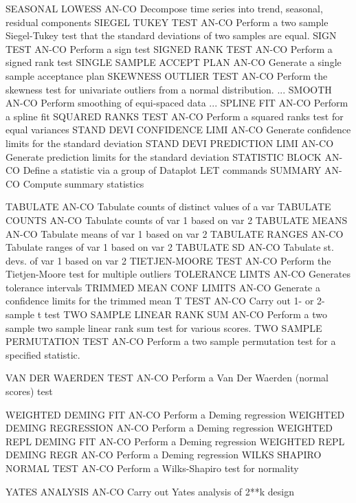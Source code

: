 SEASONAL LOWESS             AN-CO Decompose time series into trend, seasonal, residual components
SIEGEL TUKEY TEST           AN-CO Perform a two sample Siegel-Tukey test that the standard deviations of two samples are equal.
SIGN TEST                   AN-CO Perform a sign test
SIGNED RANK TEST            AN-CO Perform a signed rank test
SINGLE SAMPLE ACCEPT PLAN   AN-CO Generate a single sample acceptance plan
SKEWNESS OUTLIER TEST       AN-CO Perform the skewness test for univariate outliers from a normal distribution.
... SMOOTH                  AN-CO Perform smoothing of equi-spaced data
... SPLINE FIT              AN-CO Perform a spline fit
SQUARED RANKS TEST          AN-CO Perform a squared ranks test for equal variances
STAND DEVI CONFIDENCE LIMI  AN-CO Generate confidence limits for the standard deviation
STAND DEVI PREDICTION LIMI  AN-CO Generate prediction limits for the standard deviation
STATISTIC BLOCK             AN-CO Define a statistic via a group of Dataplot LET commands
SUMMARY                     AN-CO Compute summary statistics

TABULATE                    AN-CO Tabulate counts of distinct values of a var
TABULATE COUNTS             AN-CO Tabulate counts of var 1 based on var 2
TABULATE MEANS              AN-CO Tabulate means of var 1 based on var 2
TABULATE RANGES             AN-CO Tabulate ranges of var 1 based on var 2
TABULATE SD                 AN-CO Tabulate st. devs. of var 1 based on var 2
TIETJEN-MOORE TEST          AN-CO Perform the Tietjen-Moore test for multiple outliers
TOLERANCE LIMTS             AN-CO Generates tolerance intervals
TRIMMED MEAN CONF LIMITS    AN-CO Generate a confidence limits for the trimmed mean
T TEST                      AN-CO Carry out 1- or 2-sample t test
TWO SAMPLE LINEAR RANK SUM  AN-CO Perform a two sample two sample linear rank sum test for various scores.
TWO SAMPLE PERMUTATION TEST AN-CO Perform a two sample permutation test for a specified statistic.

VAN DER WAERDEN TEST        AN-CO Perform a Van Der Waerden (normal scores) test

WEIGHTED DEMING FIT         AN-CO Perform a Deming regression
WEIGHTED DEMING REGRESSION  AN-CO Perform a Deming regression
WEIGHTED REPL DEMING FIT    AN-CO Perform a Deming regression
WEIGHTED REPL DEMING REGR   AN-CO Perform a Deming regression
WILKS SHAPIRO NORMAL TEST   AN-CO Perform a Wilks-Shapiro test for normality

YATES ANALYSIS              AN-CO Carry out Yates analysis of 2**k design

